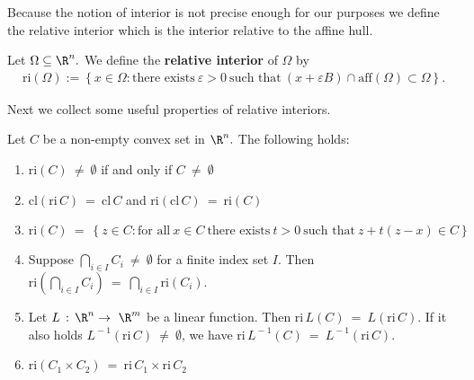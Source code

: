 Because the notion of interior is not precise enough for our purposes
we define the relative interior which is the interior relative to the affine hull.
\begin{definition*}
  Let 
  $\Omega\subseteq \R^n.$
  We define the \textbf{relative interior} of $\Omega$ by
  \begin{gather}
    \mathrm{ri}(\Omega)
    :=
    \left\{ 
      x \in \Omega 
      \colon
      \text{there exists}\ 
      \varepsilon > 0\ 
      \text{such that}\ 
      (
        x+\varepsilon B
      )
      \cap
      \mathrm{aff}(\Omega)
      \subset
      \Omega
    \right\}.
  \end{gather}
\end{definition*}
Next we collect some useful properties of relative interiors.
\begin{proposition}
  \label{cv:primer:prop}
  Let $C$ be a non-empty convex set in $\R^n.$ The following holds:
\begin{enumerate}[label={(\roman*)}]
  \item
    $
      \mathrm{ri}(C)
      \ 
      \neq
      \ 
      \emptyset
      $
if and only if
      $
      C
      \ 
      \neq
      \ 
      \emptyset
    $
  \item
    $
      \mathrm{cl}(\mathrm{ri}\,C)
      \ 
      =
      \ 
      \mathrm{cl}\,C
      $
      and
      $
      \mathrm{ri}(\mathrm{cl}\,C)
      \ 
      =
      \ 
      \mathrm{ri}(C)
    $
  \item
    $
    \mathrm{ri}(C)
      \ 
    =
      \ 
    \left\{ 
      z \in C
      \colon
      \text{for all}\ 
      x \in C \ 
      \text{there exists}\ 
      t > 0 \ 
      \text{such that}\ 
      z + t (z-x)
      \in C
    \right\}
    $
  \item
    Suppose
    $
      \bigcap_{i\in I} C_i
      \ 
      \neq
      \ 
      \emptyset
    $
    for a finite index set $I$.
    Then
    $
      \mathrm{ri}
      \left( 
        \bigcap_{i\in I} C_i
      \right)
      \ 
      =
      \ 
      \bigcap_{i\in I}  
      \mathrm{ri}(C_i)
    $.
    \item
      Let 
      $
        L\,:\,\R^n \to\  \R^m
      $
      be a linear function. Then
      $
        \mathrm{ri}\,L(C)
        \ 
        =
        \ 
        L(\mathrm{ri}\,C)
      $.
      If it also holds
      $
        L^{\!-1}(\mathrm{ri}\,C)
        \ 
        \neq
        \ 
        \emptyset
      $,
      we have
      $
      \mathrm{ri}\,L^{\!-1}(C)
      \ 
        =
      \ 
        L^{\!-1}(\mathrm{ri}\,C)
      $.
      \item
        $
          \mathrm{ri}(C_1\!\times C_2)
          \ 
          = 
          \ 
          \mathrm{ri}\,C_1
          \! 
          \times
          \mathrm{ri}\,C_2
        $
\end{enumerate}

\end{proposition}


